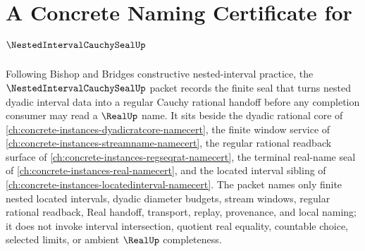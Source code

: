 \chapter{A Concrete Naming Certificate for $\NestedIntervalCauchySealUp$}
\label{ch:concrete-instances-nested-interval-cauchy-seal-namecert}

Following Bishop and Bridges constructive nested-interval practice, the $\NestedIntervalCauchySealUp$ packet records the finite seal that turns nested dyadic interval data into a regular Cauchy rational handoff before any completion consumer may read a $\RealUp$ name. It sits beside the dyadic rational core of \autoref{ch:concrete-instances-dyadicratcore-namecert}, the finite window service of \autoref{ch:concrete-instances-streamname-namecert}, the regular rational readback surface of \autoref{ch:concrete-instances-regseqrat-namecert}, the terminal real-name seal of \autoref{ch:concrete-instances-real-namecert}, and the located interval sibling of \autoref{ch:concrete-instances-locatedinterval-namecert}. The packet names only finite nested located intervals, dyadic diameter budgets, stream windows, regular rational readback, Real handoff, transport, replay, provenance, and local naming; it does not invoke interval intersection, quotient real equality, countable choice, selected limits, or ambient $\RealUp$ completeness.


